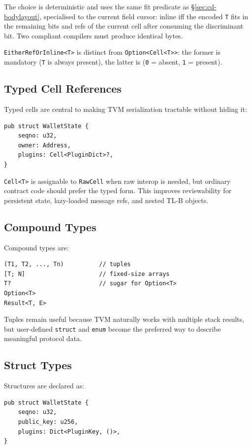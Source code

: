 \documentclass[12pt,oneside]{article}
\begin{document}
The choice is deterministic and uses the same fit predicate as
\S\ref{sec:cd-bodylayout}, specialised to the current field cursor: inline
iff the encoded \verb|T| fits in the remaining bits and refs of the current
cell after consuming the discriminant bit. Two compliant compilers must
produce identical bytes.

\verb|EitherRefOrInline<T>| is distinct from \verb|Option<Cell<T>>|: the
former is mandatory (\verb|T| is always present), the latter is
(\verb|0| = absent, \verb|1| = present).

\subsection{Typed Cell References}
Typed cells are central to making TVM serialization tractable without hiding it:

\begin{verbatim}
pub struct WalletState {
    seqno: u32,
    owner: Address,
    plugins: Cell<PluginDict>?,
}
\end{verbatim}

\verb|Cell<T>| is assignable to \verb|RawCell| when raw interop is needed, but
ordinary contract code should prefer the typed form. This improves reviewability
for persistent state, lazy-loaded message refs, and nested TL-B objects.

\subsection{Compound Types}
Compound types are:

\begin{verbatim}
(T1, T2, ..., Tn)          // tuples
[T; N]                     // fixed-size arrays
T?                         // sugar for Option<T>
Option<T>
Result<T, E>
\end{verbatim}

Tuples remain useful because TVM naturally works with multiple stack results,
but user-defined \verb|struct| and \verb|enum| become the preferred way to
describe meaningful protocol data.

\subsection{Struct Types}
Structures are declared as:

\begin{verbatim}
pub struct WalletState {
    seqno: u32,
    public_key: u256,
    plugins: Dict<PluginKey, ()>,
}
\end{verbatim}
\end{document}
